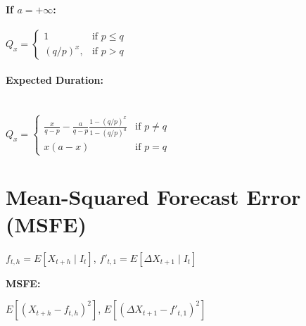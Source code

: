 \paragraph{If $a = + \infty$:}
$Q_x =
    \begin{cases}
        1  & \text{if } p \leq q \\
        (q/p)^x , & \text{if } p > q 
    \end{cases}$
\paragraph{Expected Duration:} \mbox{}\\ $Q_x =
    \begin{cases}
        \frac{x}{q-p} - \frac{a}{q-p} \frac{1- (q/p)^x}{1-(q/p)^a} & \text{if } p \neq q \\
        x (a-x)  & \text{if } p = q
    \end{cases}$

\section{Mean-Squared Forecast Error (MSFE)}
$f_{t,h} = E[X_{t+h} \mid I_t]$, $f'_{t,1} = E[\Delta X_{t+1} \mid I_t]$

\textbf{MSFE:}

$E[(X_{t+h} - f_{t,h})^2]$, $E[(\Delta X_{t+1} - f'_{t,1})^2]$